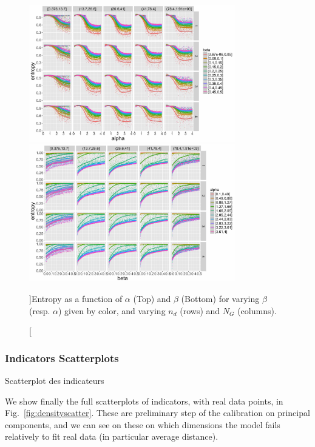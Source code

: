 \begin{figure}
\centering
\includegraphics[width=0.8\textwidth]{Figures/Density/entropy_alpha}
\includegraphics[width=0.8\textwidth]{Figures/Density/entropy_beta}
\caption[][]{Entropy as a function of $\alpha$ (Top) and $\beta$ (Bottom) for varying $\beta$ (resp. $\alpha$) given by color, and varying $n_d$ (rows) and $N_G$ (columns).}{}
\label{}
\end{figure}






\subsubsection{Indicators Scatterplots}{Scatterplot des indicateurs}


We show finally the full scatterplots of indicators, with real data points, in Fig.~\ref{fig:densityscatter}. These are preliminary step of the calibration on principal components, and we can see on these on which dimensions the model fails relatively to fit real data (in particular average distance).


